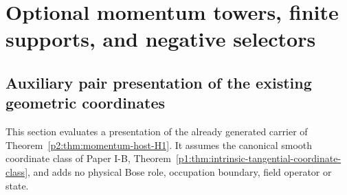 \documentclass[11pt,a4paper]{article}
\begin{document}
\section{Optional momentum towers, finite supports, and negative selectors}
\label{p2ftech:sec:momentum}

\subsection{Auxiliary pair presentation of the existing geometric coordinates}
\label{p2b:app:v2174-geometric-pair-presentation}
This section evaluates a presentation of the already generated carrier of
Theorem~\ref{p2:thm:momentum-host-H1}. It assumes the canonical smooth
coordinate class of Paper I-B,
Theorem~\ref{p1:thm:intrinsic-tangential-coordinate-class}, and adds no
physical Bose role, occupation boundary, field operator or state.
\end{document}
